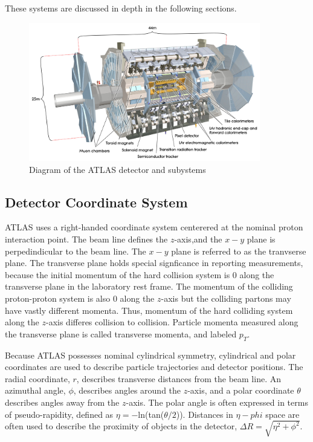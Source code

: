 These systems are discussed in depth in the following sections.
\begin{figure}[!t]
\centering 
\includegraphics[width=0.9\textwidth]{figs/lhc/ATLAS-eps-converted-to.pdf}
\caption{ Diagram of the ATLAS detector and subystems 
}
\label{figure:lhc_atlas}
\end{figure}


\subsection{Detector Coordinate System}

ATLAS uses a right-handed  coordinate system centerered at the nominal proton interaction point. The beam line defines the $z$-axis,and the $x-y$ plane is perpedindicular to the beam line. The $x-y$ plane is referred to as the tranvserse plane. The transverse plane holds special signficance in reporting measurements, because the initial momentum of the hard collision system is 0 along the transverse plane in the laboratory rest frame. The momentum of the colliding proton-proton system is also 0 along the $z$-axis but the colliding partons may have vastly different momenta. Thus, momentum of the hard colliding system along the $z$-axis differes collision to collision. Particle momenta measured along the transverse plane is called transverse momenta, and labeled $p_T$.  

Because ATLAS possesses nominal cylindrical symmetry, cylindrical and polar coordinates are used to describe particle trajectories and detector positions. The radial coordinate, $r$, describes transverse distances from the beam line. An azimuthal angle, $\phi$, describes angles around the $z$-axis, and a polar coordinate $\theta$ describes angles away from the $z$-axis. The polar angle is often expressed in terms of pseudo-rapidity, defined as $\eta=-$ln(tan($\theta/2$)). Distances in $\eta-phi$ space are often used to describe the proximity of objects in the detector, $\Delta R = \sqrt{\eta^2 + \phi^2}$.

